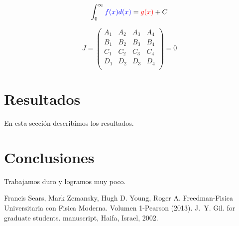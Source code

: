 \documentclass{article}
\begin{document}
\begin{align}
\int_0^\infty \textcolor{blue}{f(x)d(x)} = \textcolor{red}{g(x)} + C
\end{align}

\begin{equation}
J=
\begin{pmatrix}
A_1 & A_2 & A_3 & A_4 \\
B_1 & B_2 & B_3 & B_4 \\
C_1 & C_2 & C_3 & C_4 \\
D_1 & D_2 & D_3 & D_4 \\
\end{pmatrix}=0
\end{equation}




\section{Resultados}\label{results}
En esta sección describimos los resultados.

\section{Conclusiones}\label{conclusions}
Trabajamos duro y logramos muy poco.

\begin{thebibliography}{1}

Francis Sears, Mark Zemansky, Hugh D. Young, Roger A. Freedman-Fisica Universitaria con Fisica Moderna. Volumen 1-Pearson (2013).
J.~Y. Gil.
\newblock {\LaTeXe} for graduate students.
\newblock manuscript, Haifa, Israel, 2002.
\end{thebibliography}
\end{document}
